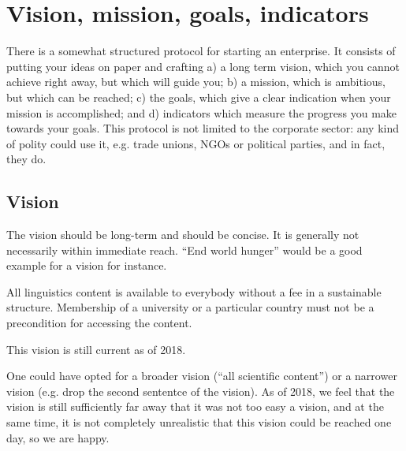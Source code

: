 \documentclass[output=guidelines,nonflat,smallfont,
draftmode
]{langsci/langscibook}
\newcommand{\background}[1]{ 
  \vspace{5mm}
  \renewcommand{\tblslinecolour}{lsDarkBlue}
  \tblssy[red]{explore2}{Background}{\vspace*{-5mm}#1}
}
\newcommand{\langscisolution}[1]{
  \renewcommand{\tblslinecolour}{lsLightBlue}
  \tblssy{langsci}{LangSci solution}{\vspace*{-5mm}#1}
}
\newcommand{\evaluation}[1]{
  \renewcommand{\tblslinecolour}{lsLightOrange}
  \tblssy{receipt}{Evaluation}{\vspace*{-5mm}#1}
}
\newcommand{\othersolutions}[1]{
  \renewcommand{\tblslinecolour}{lsDarkGreenOne}
  \tblssy{more}{Other solutions}{\vspace*{-5mm}#1}
}
\renewcommand{\tblssy}[4][black!12]{%
  \renewcommand{\langscisymbol}{#2}\renewcommand{\tblsboxcolor}{#1}
  \begin{mdframed}[style=yellowexercise,frametitle={#3}]
    #4
  \end{mdframed}
}
\begin{document}
\section{Vision, mission, goals, indicators}
There is a somewhat structured protocol for starting an enterprise. It consists of putting your ideas on paper and crafting a) a long term vision, which you cannot achieve right away, but which will guide you;
b) a mission, which is ambitious, but which can be reached; 
c) the goals, which give a clear indication when your mission is accomplished; and
d) indicators which measure the progress you make towards your goals. 
This protocol is not limited to the corporate sector: any kind of polity could use it, e.g. trade unions, NGOs or political parties, and in fact, they do. 

\subsection{Vision}
\background{The vision should be long-term and should be concise. It is generally not necessarily within immediate reach. ``End world hunger'' would be a good example for a vision for instance.}
\langscisolution{
All linguistics content is available to everybody without a fee in a sustainable structure. Membership of a university or a particular country must not be a precondition for accessing the content.}
\evaluation{This vision is still current as of 2018.}
\othersolutions{One could have opted for a broader vision (``all scientific content'') or a narrower vision (e.g. drop the second sententce of the vision). As of 2018, we feel that the vision is still sufficiently far away that it was not too easy a vision, and at the same time, it is not completely unrealistic that this vision could be reached one day, so we are happy.}
 
\end{document}
